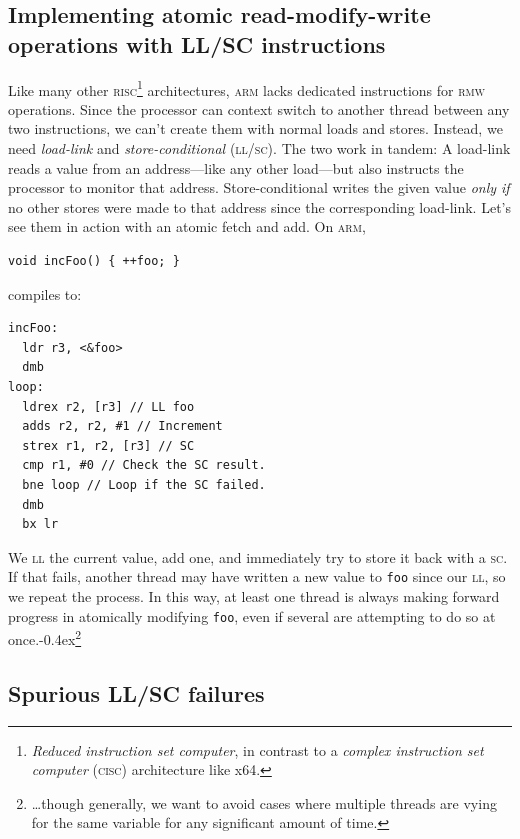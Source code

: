 \documentclass[fontsize=10pt, numbers=endperiod]{scrartcl}
\newcommand{\codesize}{\fontsize{10pt}{12pt}}
\newcommand{\punckern}{\kern-0.4ex}
\newcommand{\introduce}[1]{\textit{#1}}
\newenvironment{colfigure}
  {\par\vspace{1\baselineskip minus 0.5\baselineskip}\noindent\minipage{\linewidth}}
  {\endminipage\vspace*{1\baselineskip minus 0.7\baselineskip}}
\begin{document}
\begin{multicols*}{2}
\section{Implementing atomic read-modify-write operations with LL/SC instructions}

Like many other
\textsc{risc}\footnote{\introduce{Reduced instruction set computer},
in contrast to a \introduce{complex instruction set computer} \textsc{(cisc)}
architecture like x64.}
architectures, \textsc{arm} lacks dedicated instructions for
\textsc{rmw} operations.
Since the processor can context switch to another thread
between any two instructions,
we can't create them with normal loads and stores.
Instead, we need
\introduce{load-link} and \introduce{store-conditional} \textsc{(ll/sc)}.
The two work in tandem:
A load-link reads a value from an address---like any other load---but also
instructs the processor to monitor that address.
Store-conditional writes the given value \emph{only if}
no other stores were made to that address
since the corresponding load-link.
Let's see them in action with an atomic fetch and add.
On \textsc{arm},
\begin{colfigure}
\begin{verbatim}
void incFoo() { ++foo; }
\end{verbatim}
compiles to:
\begin{lstlisting}[language={[ARM]Assembler}]
incFoo:
  ldr r3, <&foo>
  dmb
loop:
  ldrex r2, [r3] // LL foo
  adds r2, r2, #1 // Increment
  strex r1, r2, [r3] // SC
  cmp r1, #0 // Check the SC result.
  bne loop // Loop if the SC failed.
  dmb
  bx lr
\end{lstlisting}
\end{colfigure}
We \textsc{ll} the current value, add one, and immediately try to store it back
with a \textsc{sc}. If that fails, another thread may have
written a new value to \texttt{foo} since our \textsc{ll},
so we repeat the process.
In this way, at least one thread is always making forward progress in atomically
modifying \texttt{foo}, even if several are attempting to do so at
once.\punckern\footnote{\ldots though generally,
we want to avoid cases where multiple threads are vying for the same variable
for any significant amount of time.}

\subsection{Spurious LL/SC failures}
\label{spurious-ll/sc-failures}


\end{multicols*}
\end{document}
